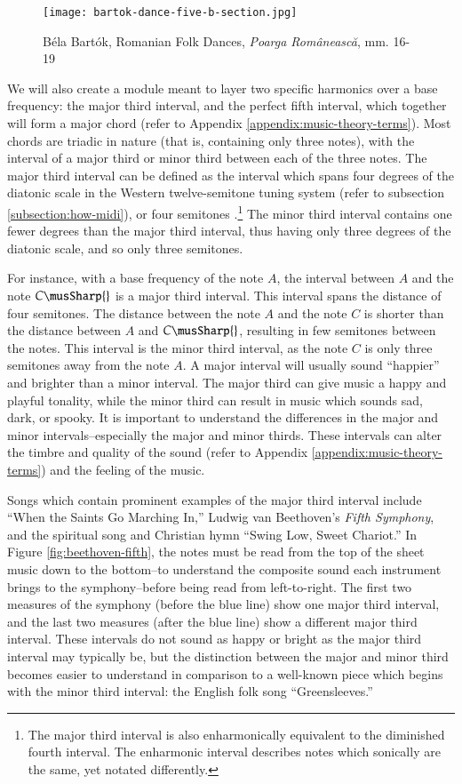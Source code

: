 \begin{figure}[h]
  \centering
  \texttt{[image: bartok-dance-five-b-section.jpg]}
  \caption{Béla Bartók, Romanian Folk Dances, \textit{Poarga Românească}, mm. 16-19}
  \label{fig:bartok-dance-five-b-section}
\end{figure}

We will also create a module meant to layer two specific harmonics over a base frequency: the major third interval, and the perfect fifth interval, which together will form a major chord (refer to Appendix \ref{appendix:music-theory-terms}). Most chords are triadic in nature (that is, containing only three notes), with the interval of a major third or minor third between each of the three notes. The major third interval can be defined as the interval which spans four degrees of the diatonic scale in the Western twelve-semitone tuning system (refer to subsection \ref{subsection:how-midi}), or four semitones \cite{Nave_2017}.\footnote{The major third interval is also enharmonically equivalent to the diminished fourth interval. The enharmonic interval describes notes which sonically are the same, yet notated differently.} The minor third interval contains one fewer degrees than the major third interval, thus having only three degrees of the diatonic scale, and so only three semitones.

For instance, with a base frequency of the note $A$, the interval between $A$ and the note $C\musSharp{}$ is a major third interval. This interval spans the distance of four semitones. The distance between the note $A$ and the note $C$ is shorter than the distance between $A$ and $C\musSharp{}$, resulting in few semitones between the notes. This interval is the minor third interval, as the note $C$ is only three semitones away from the note $A$. A major interval will usually sound ``happier'' and brighter than a minor interval. The major third can give music a happy and playful tonality, while the minor third can result in music which sounds sad, dark, or spooky. It is important to understand the differences in the major and minor intervals--especially the major and minor thirds. These intervals can alter the timbre and quality of the sound (refer to Appendix \ref{appendix:music-theory-terms}) and the feeling of the music.

Songs which contain prominent examples of the major third interval include ``When the Saints Go Marching In,'' Ludwig van Beethoven's \textit{Fifth Symphony}, and the spiritual song and Christian hymn ``Swing Low, Sweet Chariot.'' In Figure \ref{fig:beethoven-fifth}, the notes must be read from the top of the sheet music down to the bottom--to understand the composite sound each instrument brings to the symphony--before being read from left-to-right. The first two measures of the symphony (before the blue line) show one major third interval, and the last two measures (after the blue line) show a different major third interval. These intervals do not sound as happy or bright as the major third interval may typically be, but the distinction between the major and minor third becomes easier to understand in comparison to a well-known piece which begins with the minor third interval: the English folk song ``Greensleeves.''

